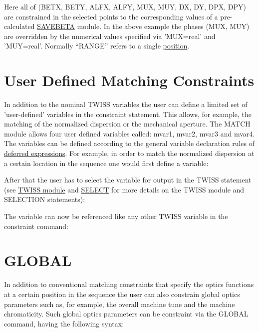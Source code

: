 Here all of (BETX, BETY, ALFX, ALFY, MUX, MUY, DX, DY, DPX, DPY)
are constrained in the selected points to the corresponding values
of a pre-calculated \href{../control/general.html#savebeta}{SAVEBETA} module.
In the above example
the phases (MUX, MUY) are overridden by the numerical values specified via
'MUX=real' and 'MUY=real'.
Normally ``RANGE'' refers to a single
\href{../Introduction/ranges.html#position}{position}.

\section{User Defined Matching Constraints}
\label{sec:userconstraint}

In addition to the nominal TWISS variables the user can define a limited
set of 'user-defined' variables in the constraint statement. This
allows, for example, the matching of the normalized dispersion or the
mechanical aperture. The MATCH module allows four user defined variables
called: mvar1, mvar2, mvar3 and mvar4. 
The variables can be defined according to the general variable
declaration rules of \hyperref[sec:defer]{deferred expressions}.
For example, in order to match the normalized dispersion at a certain
location in the sequence one would first define a variable:


After that the user has to select the variable for output in the TWISS
statement (see \href{../twiss/twiss.html}{TWISS module} and
\href{../Introduction/select.html}{SELECT} for more
details on the TWISS module and SELECTION statements):

The variable can now be referenced like any other TWISS variable
in the constraint command:

\section{GLOBAL}
\label{sec:global}

In addition to conventional matching constraints that specify the optics 
functions at a certain position in the sequence the user can also constrain 
global optics parameters such as, for example, the overall machine tune
and the machine chromaticity. Such global optics parameters can be
constraint via the  GLOBAL command, having the following syntax:

